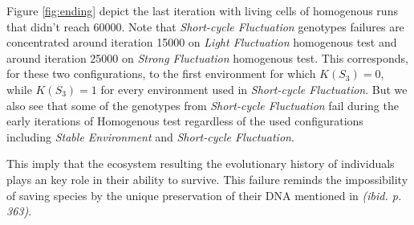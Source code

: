 Figure \ref{fig:ending} depict the last iteration with living cells of homogenous runs that didn't reach 60000. Note that \emph{Short-cycle Fluctuation} genotypes failures are concentrated around iteration 15000 on \emph{Light Fluctuation} homogenous test and around iteration 25000 on \emph{Strong Fluctuation} homogenous test. This corresponds, for these two configurations, to the first environment for which $K(S_3)=0$, while $K(S_3)=1$ for every environment used in \emph{Short-cycle Fluctuation}. But we also see that some of the genotypes from \emph{Short-cycle Fluctuation} fail during the early iterations of Homogenous test regardless of the used configurations including \emph{Stable Environment} and \emph{Short-cycle Fluctuation}.

This imply that the ecosystem resulting the evolutionary history of individuals plays an key role in their ability to survive. This failure reminds the impossibility of saving species by the unique preservation of their DNA mentioned in \cite{jablonka2014evolution}
\emph{(ibid. p. 363)}.

